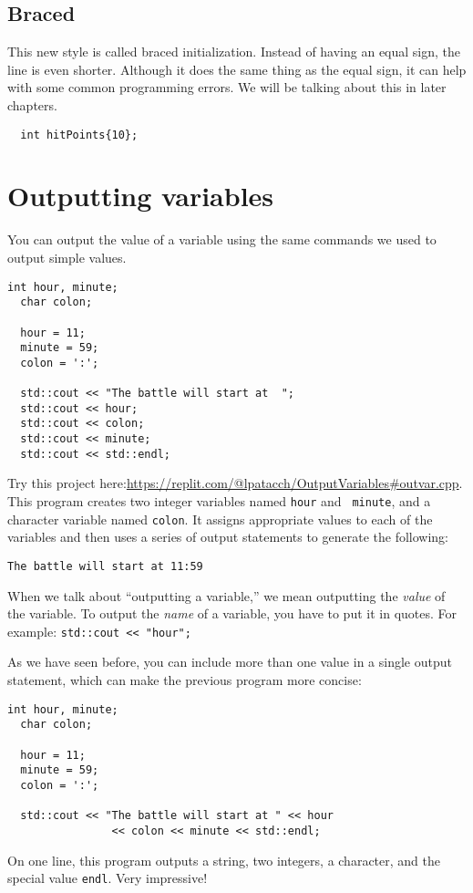 \subsection{Braced}
This new style is called braced initialization. Instead of having an equal sign, the line is even shorter. Although it does the same thing as the equal sign, it can help with some common programming errors. We will be talking about this in later chapters.
\begin{lstlisting}
  int hitPoints{10};
\end{lstlisting}
\section{Outputting variables}
\label{output}

You can output the value of a variable using the same commands
we used to output simple values.

\begin{lstlisting}[frame=single]
  int hour, minute;
  char colon;

  hour = 11;
  minute = 59;
  colon = ':';

  std::cout << "The battle will start at  ";
  std::cout << hour;
  std::cout << colon;
  std::cout << minute;
  std::cout << std::endl;
\end{lstlisting}

%
Try this project here:\url{https://replit.com/@lpatacch/OutputVariables#outvar.cpp}.
This program creates two integer variables named {\tt hour} and {\tt
minute}, and a character variable named {\tt colon}.  It assigns
appropriate values to each of the variables and then uses a series
of output statements to generate the following:

\begin{verbatim}
The battle will start at 11:59
\end{verbatim}

When we talk about ``outputting a variable,'' we mean outputting the
{\em value} of the variable.  To output the {\em name} of a variable,
you have to put it in quotes.  For example: {\tt std::cout << "hour";}

As we have seen before, you can include more than one value in
a single output statement, which can make the previous program more
concise:

\begin{lstlisting}[frame=single]
  int hour, minute;
  char colon;

  hour = 11;
  minute = 59;
  colon = ':';

  std::cout << "The battle will start at " << hour 
                << colon << minute << std::endl;
\end{lstlisting}
%
On one line, this program outputs a string, two integers, a character,
and the special value {\tt endl}.  Very impressive!

